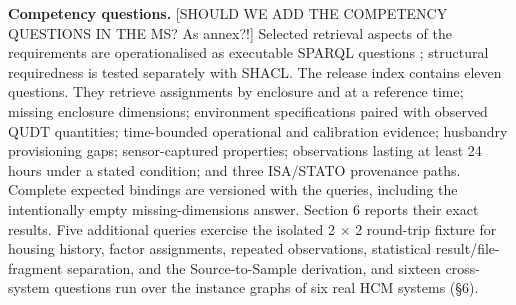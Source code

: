 \textbf{Competency questions.} [SHOULD WE ADD THE COMPETENCY QUESTIONS IN THE MS? As annex?!]  Selected retrieval aspects of the requirements are operationalised as executable SPARQL questions \cite{noy2001,lot2022}; structural requiredness is tested separately with SHACL. The release index contains eleven questions. They retrieve assignments by enclosure and at a reference time; missing enclosure dimensions; environment specifications paired with observed QUDT quantities; time-bounded operational and calibration evidence; husbandry provisioning gaps; sensor-captured properties; observations lasting at least 24 hours under a stated condition; and three ISA/STATO provenance paths. Complete expected bindings are versioned with the queries, including the intentionally empty missing-dimensions answer. Section 6 reports their exact results. Five additional queries exercise the isolated 2 $\times$ 2 round-trip fixture for housing history, factor assignments, repeated observations, statistical result/file-fragment separation, and the Source-to-Sample derivation, and sixteen cross-system questions run over the instance graphs of six real HCM systems (\S{}6).
